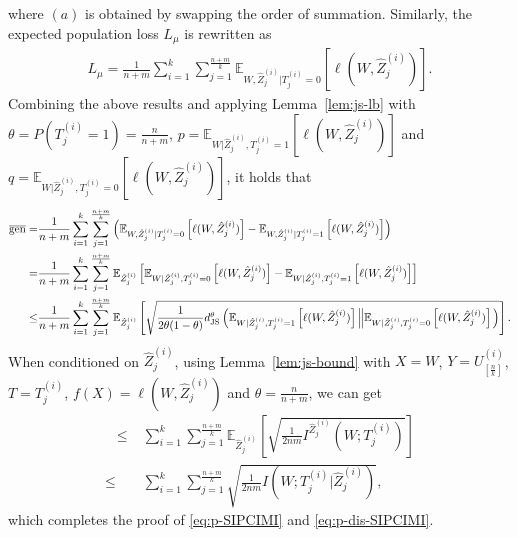 \documentclass[onecolumn,romanappendices,10pt]{IEEEtran}
\newcommand{\EE}{{\mathbb{E}}}
\DeclareMathOperator{\gen}{\overline{gen}}
\begin{document}
	where $(a)$ is obtained by swapping the order of summation. Similarly, the expected population loss $L_\mu$ is rewritten as
	\begin{equation}
		\begin{aligned}
			L_\mu = \frac{1}{n+m} \sum_{i=1}^{k} \sum_{j=1}^{\frac{n+m}{k}} \EE_{W, \hat{Z}^{(i)}_j | T^{(i)}_j = 0} \left[ \ell(W, \hat{Z}^{(i)}_j) \right].
		\end{aligned}\label{eq:exp-pop-risk-single}
	\end{equation}
	Combining the above results and applying Lemma~\ref{lem:js-lb} with $\theta = P(T^{(i)}_j = 1) = \frac{n}{n+m}$, $p = \EE_{W | \hat{Z}^{(i)}_j, T^{(i)}_j = 1} \left[ \ell(W, \hat{Z}^{(i)}_j) \right]$ and $q = \EE_{W | \hat{Z}^{(i)}_j, T^{(i)}_j = 0} \left[ \ell(W, \hat{Z}^{(i)}_j) \right]$, it holds that
	\begin{equation}
		\begin{aligned}
			\gen =& \frac{1}{n+m} \sum_{i=1}^{k} \sum_{j=1}^{\frac{n+m}{k}} \left( \EE_{W, \hat{Z}^{(i)}_j | T^{(i)}_j = 0} \left[ \ell(W, \hat{Z}^{(i)}_j) \right] - \EE_{W, \hat{Z}^{(i)}_j | T^{(i)}_j = 1} \left[ \ell(W, \hat{Z}^{(i)}_j) \right] \right) \\
			=& \frac{1}{n+m} \sum_{i=1}^{k} \sum_{j=1}^{\frac{n+m}{k}} \EE_{\hat{Z}^{(i)}_j} \left[ \EE_{W | \hat{Z}^{(i)}_j, T^{(i)}_j = 0} \left[ \ell(W, \hat{Z}^{(i)}_j) \right] - \EE_{W | \hat{Z}^{(i)}_j, T^{(i)}_j = 1} \left[ \ell(W, \hat{Z}^{(i)}_j) \right] \right] \\
			\leq& \frac{1}{n+m} \sum_{i=1}^{k} \sum_{j=1}^{\frac{n+m}{k}} \EE_{\hat{Z}^{(i)}_j} \left[ \sqrt{\frac{1}{2 \theta (1-\theta)} d^\theta_{\textnormal{JS}} \left( \EE_{W | \hat{Z}^{(i)}_j, T^{(i)}_j = 1} \left[ \ell(W, \hat{Z}^{(i)}_j) \right] \left\| \EE_{W | \hat{Z}^{(i)}_j, T^{(i)}_j = 0} \left[ \ell(W, \hat{Z}^{(i)}_j) \right] \right. \right) } \right].
		\end{aligned}
	\end{equation}
	When conditioned on $\hat{Z}^{(i)}_j$, using Lemma~\ref{lem:js-bound} with $X = W$, $Y = U^{(i)}_{[\frac{n}{k}]}$, $T = T^{(i)}_j$, $f(X) = \ell(W, \hat{Z}^{(i)}_j)$ and $\theta = \frac{n}{n+m}$, we can get
	\begin{equation}
		\begin{aligned}
			\gen \leq& \sum_{i=1}^{k} \sum_{j=1}^{\frac{n+m}{k}} \EE_{\hat{Z}^{(i)}_j} \left[ \sqrt{\frac{1}{2nm} I^{\hat{Z}^{(i)}_j}\left( W; T^{(i)}_j \right)} \right] \\
			\leq& \sum_{i=1}^{k} \sum_{j=1}^{\frac{n+m}{k}} \sqrt{\frac{1}{2nm} I\left( W; T^{(i)}_j | \hat{Z}^{(i)}_j \right)},
		\end{aligned}
	\end{equation}
	which completes the proof of \eqref{eq:p-SIPCIMI} and \eqref{eq:p-dis-SIPCIMI}.
	
\end{document}
